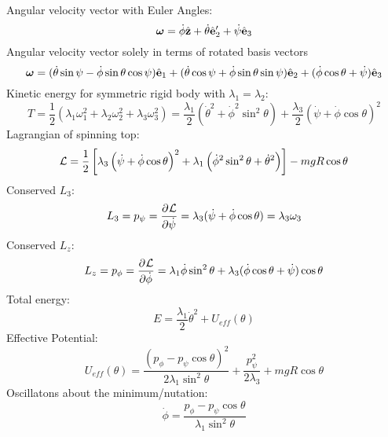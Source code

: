 Angular velocity vector with Euler Angles:
\begin{equation}
    \bm{\omega} = \dot{\phi}\hat{\mathbf{z}} + \dot{\theta}\hat{\mathbf{e}}_2' + \dot{\psi}\hat{\mathbf{e}}_3
\end{equation}
Angular velocity vector solely in terms of rotated basis vectors
\begin{equation}
    \bm{\omega} = (\dot{\theta}\sin\psi - \dot{\phi}\sin\theta\cos\psi)\hat{\mathbf{e}}_1 + (\dot{\theta}\cos\psi + \dot{\phi}\sin\theta\sin\psi)\hat{\mathbf{e}}_2 + (\dot{\phi}\cos\theta + \dot{\psi})\hat{\mathbf{e}}_3
\end{equation}
Kinetic energy for symmetric rigid body with $\lambda_1 = \lambda_2$:
\begin{equation}
    T = \frac{1}{2}\left(\lambda_1\omega_1^2 + \lambda_2\omega_2^2 + \lambda_3\omega_3^2\right) = \frac{\lambda_1}{2}(\dot{\theta}^2 + \dot{\phi}^2\sin^2\theta) + \frac{\lambda_3}{2}(\dot{\psi} + \dot{\phi}\cos\theta)^2
\end{equation}
Lagrangian of spinning top:
\begin{equation}
    \mathcal{L} = \frac{1}{2}\left[\lambda_3\left(\dot{\psi} + \dot{\phi}\cos\theta\right)^2 + \lambda_1\left(\dot{\phi}^2\sin^2\theta + \dot{\theta}^2\right)\right] - mgR\cos\theta
\end{equation}
Conserved $L_3$:
\begin{equation}
    L_3 = p_\psi = \dpd{\LL}{\dot{\psi}} = \lambda_3(\dot{\psi} + \dot{\phi}\cos\theta) = \lambda_3\omega_3
\end{equation}
Conserved $L_z$:
\begin{equation}
    L_z = p_\phi = \dpd{\LL}{\dot{\phi}} = \lambda_1\dot{\phi}\sin^2\theta + \lambda_3(\dot{\phi}\cos\theta + \dot{\psi})\cos\theta
\end{equation}
Total energy:
\begin{equation}
    E = \frac{\lambda_1}{2}\dot{\theta}^2 + U_{eff}(\theta)
\end{equation}
Effective Potential:
\begin{equation}
    U_{eff}(\theta) = \frac{(p_\phi - p_\psi\cos\theta)^2}{2\lambda_1\sin^2\theta} + \frac{p_\psi^2}{2\lambda_3} + mgR\cos\theta
\end{equation}
Oscillatons about the minimum/nutation:
\begin{equation}
    \dot{\phi} = \frac{p_\phi - p_\psi\cos\theta}{\lambda_1\sin^2\theta}
\end{equation}
